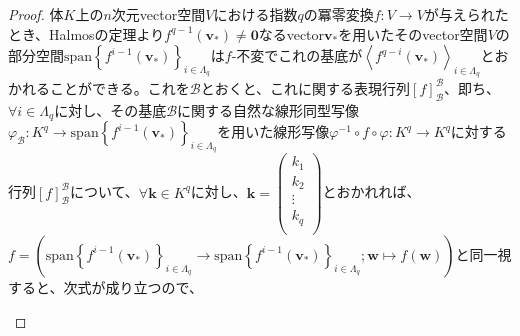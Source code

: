 \documentclass[dvipdfmx]{jsarticle}
\begin{document}
\begin{proof}
体$K$上の$n$次元vector空間$V$における指数$q$の冪零変換$f:V \rightarrow V$が与えられたとき、Halmosの定理より$f^{q - 1}\left( \mathbf{v}_{*} \right) \neq \mathbf{0}$なるvector$\mathbf{v}_{*}$を用いたそのvector空間$V$の部分空間${\mathrm{span}}\left\{ f^{i - 1}\left( \mathbf{v}_{*} \right) \right\}_{i \in \varLambda_{q}}$は$f$-不変でこれの基底が$\left\langle f^{q - i}\left( \mathbf{v}_{*} \right) \right\rangle_{i \in \varLambda_{q}}$とおかれることができる。これを$\mathcal{B}$とおくと、これに関する表現行列$[ f]_{\mathcal{B}}^{\mathcal{B}}$、即ち、$\forall i \in \varLambda_{q}$に対し、その基底$\mathcal{B}$に関する自然な線形同型写像$\varphi_{\mathcal{B}}:K^{q} \rightarrow {\mathrm{span}}\left\{ f^{i - 1}\left( \mathbf{v}_{*} \right) \right\}_{i \in \varLambda_{q}}$を用いた線形写像$\varphi^{- 1} \circ f \circ \varphi:K^{q} \rightarrow K^{q}$に対する行列$[ f]_{\mathcal{B}}^{\mathcal{B}}$について、$\forall\mathbf{k} \in K^{q}$に対し、$\mathbf{k} = \begin{pmatrix}
k_{1} \\
k_{2} \\
 \vdots \\
k_{q} \\
\end{pmatrix}$とおかれれば、$f = \left( {\mathrm{span}}\left\{ f^{i - 1}\left( \mathbf{v}_{*} \right) \right\}_{i \in \varLambda_{q}} \rightarrow {\mathrm{span}}\left\{ f^{i - 1}\left( \mathbf{v}_{*} \right) \right\}_{i \in \varLambda_{q}};\mathbf{w} \mapsto f\left( \mathbf{w} \right) \right)$と同一視すると、次式が成り立つので、
\begin{center}
\end{center}
\end{proof}
\end{document}
